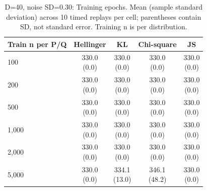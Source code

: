 \begin{table}[t]
\centering
\small
\setlength{\tabcolsep}{4pt}
\caption{D=40, noise SD=0.30: Training epochs. Mean (sample standard deviation) across 10 timed replays per cell; parentheses contain SD, not standard error. Training n is per distribution.}
\label{tab:sim-d-40-noise-sd-0-30-training-epochs}
\begin{tabular}{lcccc}
\toprule
Train n per P/Q & Hellinger & KL & Chi-square & JS \\
\midrule
100 & \shortstack{330.0\\(0.0)} & \shortstack{330.0\\(0.0)} & \shortstack{330.0\\(0.0)} & \shortstack{330.0\\(0.0)} \\
200 & \shortstack{330.0\\(0.0)} & \shortstack{330.0\\(0.0)} & \shortstack{330.0\\(0.0)} & \shortstack{330.0\\(0.0)} \\
500 & \shortstack{330.0\\(0.0)} & \shortstack{330.0\\(0.0)} & \shortstack{330.0\\(0.0)} & \shortstack{330.0\\(0.0)} \\
1,000 & \shortstack{330.0\\(0.0)} & \shortstack{330.0\\(0.0)} & \shortstack{330.0\\(0.0)} & \shortstack{330.0\\(0.0)} \\
2,000 & \shortstack{330.0\\(0.0)} & \shortstack{330.0\\(0.0)} & \shortstack{330.0\\(0.0)} & \shortstack{330.0\\(0.0)} \\
5,000 & \shortstack{330.0\\(0.0)} & \shortstack{334.1\\(13.0)} & \shortstack{346.1\\(48.2)} & \shortstack{330.0\\(0.0)} \\
\bottomrule
\end{tabular}
\end{table}

